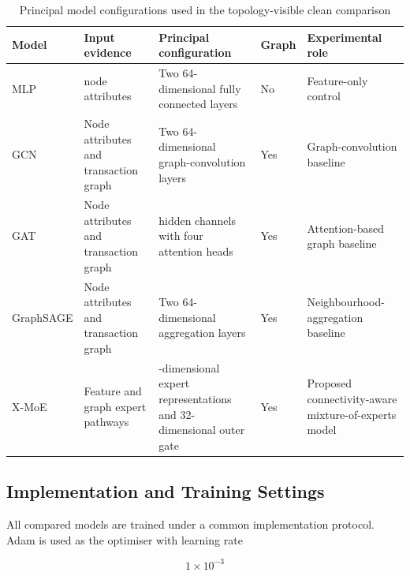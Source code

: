 \documentclass{ieeeaccess}
\begin{document}
\begin{table}[t]
\centering
\caption{Principal model configurations used in the topology-visible clean comparison}
\label{tab:model_configuration}

\renewcommand{\arraystretch}{1.12}
\setlength{\tabcolsep}{4pt}
\scriptsize

\begin{tabularx}{\textwidth}{
>{\raggedright\arraybackslash}p{1.9cm}
>{\raggedright\arraybackslash}p{3.0cm}
>{\raggedright\arraybackslash}p{3.2cm}
>{\centering\arraybackslash}p{1.6cm}
>{\raggedright\arraybackslash}X
}
\toprule
\textbf{Model} &
\textbf{Input evidence} &
\textbf{Principal configuration} &
\textbf{Graph} &
\textbf{Experimental role} \\
\midrule

MLP
&
23 node attributes
&
Two 64-dimensional fully connected layers
&
No
&
Feature-only control
\\[2pt]

GCN
&
Node attributes and transaction graph
&
Two 64-dimensional graph-convolution layers
&
Yes
&
Graph-convolution baseline
\\[2pt]

GAT
&
Node attributes and transaction graph
&
32 hidden channels with four attention heads
&
Yes
&
Attention-based graph baseline
\\[2pt]

GraphSAGE
&
Node attributes and transaction graph
&
Two 64-dimensional aggregation layers
&
Yes
&
Neighbourhood-aggregation baseline
\\[2pt]

X-MoE
&
Feature and graph expert pathways
&
64-dimensional expert representations and 32-dimensional outer gate
&
Yes
&
Proposed connectivity-aware mixture-of-experts model
\\

\bottomrule
\end{tabularx}
\end{table}


\subsection{Implementation and Training Settings}

All compared models are trained under a common implementation protocol. Adam is used as the optimiser with learning rate

\begin{equation}
1\times10^{-3}
\end{equation}
\end{document}
